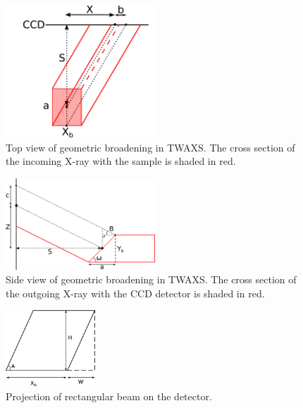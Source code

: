 \begin{figure}[htbp]
  \centering
  \includegraphics[width=0.5\textwidth]{figures/ripple/MMs/transmission/geometric_broadening2}
  \caption{Top view of geometric broadening in TWAXS. The cross section of the incoming X-ray 
  with the sample is shaded in red.}
  \label{fig:gb_trans2}
\end{figure}

\begin{figure}[htbp]
  \centering
  \includegraphics[width=0.5\textwidth]{figures/ripple/MMs/transmission/geometric_broadening3}
  \caption{Side view of geometric broadening in TWAXS. The cross section of the outgoing X-ray 
  with the CCD detector is shaded in red.}
  \label{fig:gb_trans3}
\end{figure}

\begin{figure}[htbp]
  \centering
  \includegraphics[width=0.3\textwidth]{figures/ripple/MMs/transmission/geometric_broadening4}
  \caption{Projection of rectangular beam on the detector.}
  \label{fig:gb_trans4}
\end{figure}

\newpage
